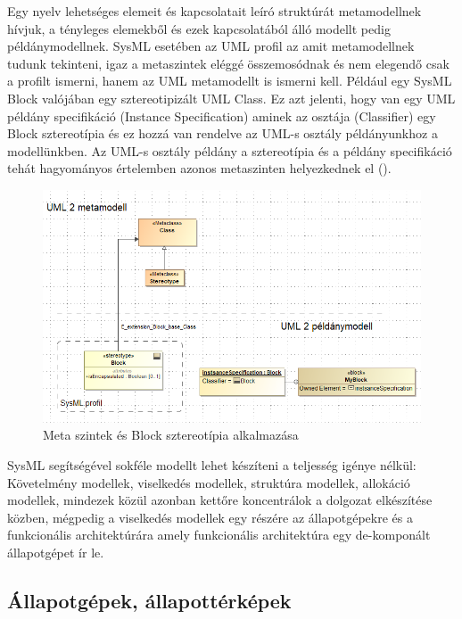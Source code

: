 Egy nyelv lehetséges elemeit és kapcsolatait leíró struktúrát metamodellnek hívjuk, a tényleges elemekből és ezek kapcsolatából álló modellt pedig példánymodellnek.  SysML esetében az UML profil az amit metamodellnek tudunk tekinteni, igaz a metaszintek eléggé összemosódnak és nem elegendő csak a profilt ismerni, hanem az UML metamodellt is ismerni kell. Például egy SysML Block valójában egy sztereotipizált UML Class. Ez azt jelenti, hogy van egy UML példány specifikáció (Instance Specification) aminek az osztája (Classifier) egy Block sztereotípia és ez hozzá van rendelve az UML-s osztály példányunkhoz a modellünkben. Az UML-s osztály példány a sztereotípia és a példány specifikáció tehát hagyományos értelemben azonos metaszinten helyezkednek el ().

\begin{figure}[!ht]
	\centering
	\includegraphics[width=150mm, keepaspectratio]{figures/preliminaries/block-stereotype.png}
	\caption{Meta szintek és Block sztereotípia alkalmazása}
	\label{fig:block-stereotype}
\end{figure}

SysML segítségével sokféle modellt lehet készíteni a teljesség igénye nélkül: Követelmény modellek, viselkedés modellek, struktúra modellek, allokáció modellek, mindezek közül azonban kettőre koncentrálok a dolgozat elkészítése közben, mégpedig a viselkedés modellek egy részére az állapotgépekre és a funkcionális architektúrára amely funkcionális architektúra egy de-komponált állapotgépet ír le.



\subsection{Állapotgépek, állapottérképek}

